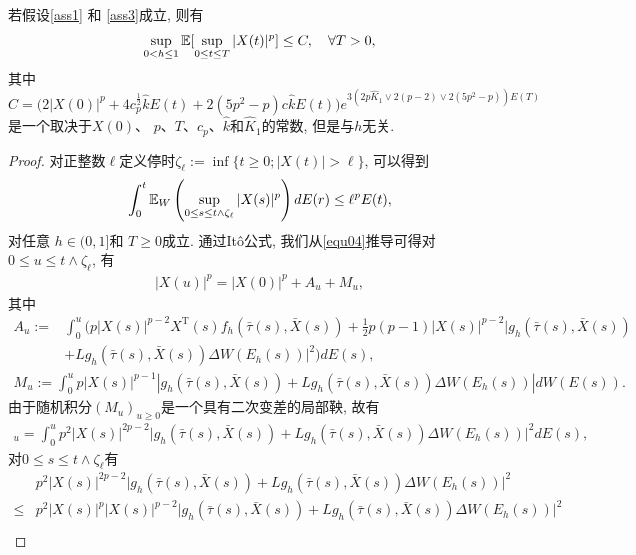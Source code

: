 \par
\begin{lemma}
    \label{lemma3}
    若假设\ref{ass1} 和 \ref{ass3}成立, 则有
    \begin{align}
        \label{equ08}
        \sup_{0< h \leq 1}\mathbb{E} [\sup_{0\leq t\leq T}|X(t)|^p]\leq C, \quad \forall T>0,
    \end{align}
    其中 $C=\bigg(2|X(0)|^p+4c_{p}^{\frac{1}{2}}\hat{k}E(t)+2(5p^{2}-p)c\hat{k}E(t)\bigg)e^{3(2p\hat{K}_1\vee 2(p-2)\vee2(5p^{2}-p))E(T)}$是一个取决于$X(0)$、 $p$、$T$、$c_{p}$、$\hat{k}$和$\hat{K}_1$的常数, 但是与$h$无关.
\end{lemma}
\begin{proof}
对正整数$\ell$定义停时$\zeta_{\ell}:=\inf\{ t\geq 0; |X(t)|>\ell \}$, 可以得到
\begin{align*}
    \int_{0}^{t}{\mathbb{E}_W\left(\sup_{0\leq s \leq t\wedge \zeta_{\ell}}|X(s)|^p\right)dE(r)}\leq \ell^pE(t),
\end{align*}
对任意 $h\in(0,1]$和 $T\geq 0$成立. 通过It\^o公式, 我们从\eqref{equ04}推导可得对$0\leq u\leq t\wedge \zeta_{\ell}$, 有
\begin{align}
    \label{th3121}
    |X(u)|^p=|X(0)|^p+A_u+M_u,
\end{align}
其中
\begin{align*}
    A_u:=&\int_{0}^{u}\bigg( p|X(s)|^{p-2}X^{\mathrm{T}}(s)f_{h}(\bar{\tau}(s),\bar{X}(s))+\frac{1}{2}p(p-1)|X(s)|^{p-2}|g_{h}(\bar{\tau}(s),\bar{X}(s))\\
    &+Lg_{h}(\bar{\tau}(s),\bar{X}(s))\Delta W(E_{h}(s))|^2\bigg)dE(s),
\end{align*}
\begin{align*}
    M_u:=
    \int_{0}^{u}{p|X(s)|^{p-1}|g_{h}(\bar{\tau}(s),\bar{X}(s))+Lg_{h}(\bar{\tau}(s),\bar{X}(s))\Delta W(E_{h}(s))|dW(E(s))}.
\end{align*}
由于随机积分$(M_u)_{u\geq 0}$是一个具有二次变差的局部鞅, 故有
 \begin{align*}
    [M,M]_u=\int_{0}^{u}{p^2|X(s)|^{2p-2}\big|g_{h}(\bar{\tau}(s),\bar{X}(s))+Lg_{h}(\bar{\tau}(s),\bar{X}(s))\Delta W(E_{h}(s))\big|^2 dE(s)},
\end{align*}
对$0\leq s\leq t\wedge \zeta_{\ell}$有
 \begin{align*}
    &p^2|X(s)|^{2p-2}\big|g_{h}(\bar{\tau}(s),\bar{X}(s))+Lg_{h}(\bar{\tau}(s),\bar{X}(s))\Delta W(E_{h}(s))\big|^2\\
    \leq& p^2|X(s)|^p|X(s)|^{p-2}\big|g_{h}(\bar{\tau}(s),\bar{X}(s))+Lg_{h}(\bar{\tau}(s),\bar{X}(s))\Delta W(E_{h}(s))\big|^2\\

\end{align*}
\end{proof}

